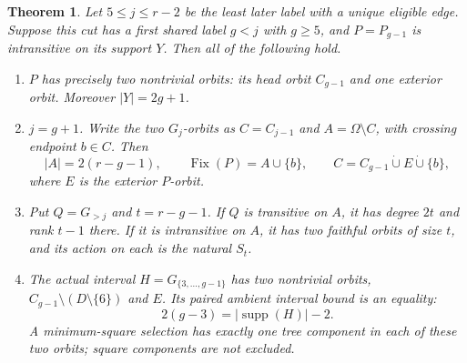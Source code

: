 \documentclass[11pt,a4paper]{article}
\newtheorem{theorem}{Theorem}
\begin{document}
\begin{theorem}
Let $5\le j\le r-2$ be the least later label with a unique eligible edge.
Suppose this cut has a first shared label $g<j$ with $g\ge5$,
and $P=P_{g-1}$ is intransitive on its support $Y$.
Then all of the following hold.
\begin{enumerate}
\item $P$ has precisely two nontrivial orbits: its head orbit
      $C_{g-1}$ and one exterior orbit. Moreover $|Y|=2g+1$.
\item $j=g+1$. Write the two $G_j$-orbits as $C=C_{j-1}$
      and $A=\Omega\setminus C$, with crossing endpoint $b\in C$.
      Then
      \[
       |A|=2(r-g-1),\qquad
       \operatorname{Fix}(P)=A\cup\{b\},\qquad
       C=C_{g-1}\mathbin{\dot\cup} E\mathbin{\dot\cup}\{b\},
      \]
      where $E$ is the exterior $P$-orbit.
\item Put $Q=G_{>j}$ and $t=r-g-1$. If $Q$ is transitive
      on $A$, it has degree $2t$ and rank $t-1$ there.
      If it is intransitive on $A$, it has two faithful orbits
      of size $t$, and its action on each is the natural $S_t$.
\item The actual interval $H=G_{\{3,\ldots,g-1\}}$ has
      two nontrivial orbits, $C_{g-1}\setminus(D\setminus\{6\})$
      and $E$. Its paired ambient interval bound is an equality:
      \[
        2(g-3)=|\operatorname{supp}(H)|-2.
      \]
      A minimum-square selection has exactly one tree component
      in each of these two orbits; square components are not excluded.
\end{enumerate}
\end{theorem}
\end{document}
